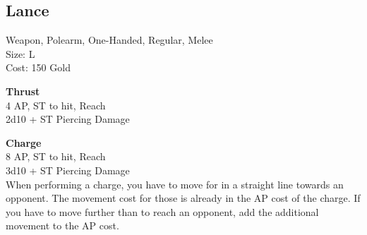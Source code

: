 \subsection{Lance}\label{weapon:lance}
Weapon, Polearm, One-Handed, Regular, Melee\\
Size: L\\
Cost: 150 Gold

\textbf{Thrust}\\
4 AP, ST to hit,  Reach\\
2d10 + \texttimes ST Piercing Damage

\textbf{Charge}\\
8 AP, ST to hit,  Reach\\
3d10 + \texttimes ST Piercing Damage\\
When performing a charge, you have to move for  in a straight line towards an opponent.
The movement cost for those  is already in the AP cost of the charge.
If you have to move further than  to reach an opponent, add the additional movement to the AP cost.